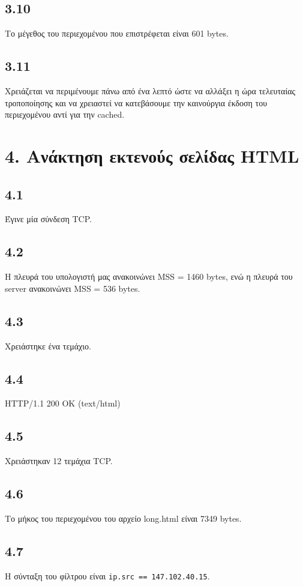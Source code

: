 		\subsection*{3.10}
			Το μέγεθος του περιεχομένου που επιστρέφεται είναι 601 bytes.

		\subsection*{3.11}
			Χρειάζεται να περιμένουμε πάνω από ένα λεπτό ώστε να αλλάξει η ώρα τελευταίας τροποποίησης και να χρειαστεί να κατεβάσουμε την καινούργια έκδοση του περιεχομένου αντί για την cached.
		
	\section*{4. Ανάκτηση εκτενούς σελίδας HTML}

		\subsection*{4.1}
			Έγινε μία σύνδεση TCP.

		\subsection*{4.2}
			Η πλευρά του υπολογιστή μας ανακοινώνει MSS = 1460 bytes, ενώ η πλευρά του server ανακοινώνει MSS = 536 bytes.

		\subsection*{4.3}
			Χρειάστηκε ένα τεμάχιο.

		\subsection*{4.4}
			HTTP/1.1 200 OK (text/html)

		\subsection*{4.5}
			Χρειάστηκαν 12 τεμάχια TCP.

		\subsection*{4.6}
			Το μήκος του περιεχομένου του αρχείο long.html είναι 7349 bytes.

		\subsection*{4.7}
			Η σύνταξη του φίλτρου είναι \verb|ip.src == 147.102.40.15|.

